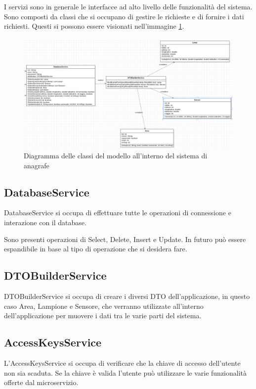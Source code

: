 I servizi sono in generale le interfacce ad alto livello delle funzionalità del sistema. Sono composti da classi che si occupano di gestire le richieste e di fornire i dati richiesti.
Questi si possono essere visionati nell'immagine \ref{fig:services_anagrafe}.

\begin{figure}[ht]
    \centering
    \includegraphics[width=\textwidth]{img/services_anagrafe.png}
    \caption{Diagramma delle classi del modello all'interno del sistema di anagrafe}
    \label{fig:services_anagrafe}
\end{figure}

\subsection{DatabaseService}

DatabaseService si occupa di effettuare tutte le operazioni di connessione e interazione con il database. 

Sono presenti operazioni di Select, Delete, Insert e Update. In futuro può essere espandibile in base al tipo di operazione che si desidera fare.

\subsection{DTOBuilderService}
DTOBuilderService si occupa di creare i diversi DTO dell'applicazione, in questo caso Area, Lampione e Sensore, che verranno utilizzate all'interno dell'applicazione per muovere i dati tra le varie parti del sistema.

\subsection{AccessKeysService}
L'AccessKeysService si occupa di verificare che la chiave di accesso dell'utente non sia scaduta. Se la chiave è valida l'utente può utilizzare le varie funzionalità offerte dal microservizio.

